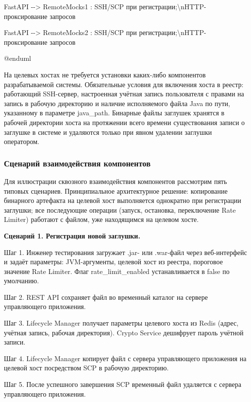 \documentclass[
]{article}
\begin{document}
FastAPI -\/-\textgreater{} RemoteMocks1 : SSH/SCP при
регистрации;\textbackslash nHTTP-проксирование запросов

FastAPI -\/-\textgreater{} RemoteMocks2 : SSH/SCP при
регистрации;\textbackslash nHTTP-проксирование запросов

@enduml

На целевых хостах не требуется установки каких-либо компонентов
разрабатываемой системы. Обязательные условия для включения хоста в
реестр: работающий SSH-сервер, настроенная учётная запись пользователя с
правами на запись в рабочую директорию и наличие исполняемого файла Java
по пути, указанному в параметре java\_path. Бинарные файлы заглушек
хранятся в рабочей директории хоста на протяжении всего времени
существования записи о заглушке в системе и удаляются только при явном
удалении заглушки оператором.

\subsubsection{Сценарий взаимодействия
компонентов}\label{ux441ux446ux435ux43dux430ux440ux438ux439-ux432ux437ux430ux438ux43cux43eux434ux435ux439ux441ux442ux432ux438ux44f-ux43aux43eux43cux43fux43eux43dux435ux43dux442ux43eux432}

Для иллюстрации сквозного взаимодействия компонентов рассмотрим пять
типовых сценариев. Принципиальное архитектурное решение: копирование
бинарного артефакта на целевой хост выполняется однократно при
регистрации заглушки; все последующие операции (запуск, остановка,
переключение Rate Limiter) работают с файлом, уже находящимся на целевом
хосте.

\textbf{Сценарий 1. Регистрация новой заглушки.}

Шаг 1. Инженер тестирования загружает .jar- или .war-файл через
веб-интерфейс и задаёт параметры: JVM-аргументы, целевой хост из
реестра, пороговое значение Rate Limiter. Флаг rate\_limit\_enabled
устанавливается в false по умолчанию.

Шаг 2. REST API сохраняет файл во временный каталог на сервере
управляющего приложения.

Шаг 3. Lifecycle Manager получает параметры целевого хоста из Redis
(адрес, учётная запись, рабочая директория). Crypto Service дешифрует
пароль учётной записи.

Шаг 4. Lifecycle Manager копирует файл с сервера управляющего приложения
на целевой хост посредством SCP в рабочую директорию.

Шаг 5. После успешного завершения SCP временный файл удаляется с сервера
управляющего приложения.
\end{document}
